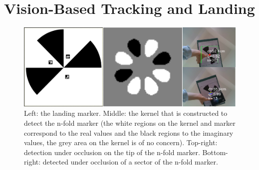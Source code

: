 \documentclass[conference]{IEEEtran}
\newcommand{\stt}[1]{{\small\tt #1}} %
\newcommand{\powprof}{\stt{powprofiler}}
\begin{document}

\section{Vision-Based Tracking and Landing}
\label{sec:landing}


\begin{figure}
\centering
\includegraphics[scale=0.26]{n-fold-for-landing3.png}
\caption{Left: the landing marker. Middle: the kernel that is constructed to detect the n-fold marker (the white regions on the kernel and marker correspond to the real values and the black regions to the imaginary values, the grey area on the kernel is of no concern).
Top-right: detection under occlusion on the tip of the n-fold marker.
Bottom-right: detected under occlusion of a sector of the n-fold marker.}
\label{fig:LandingMarker}
\end{figure}
\end{document}
